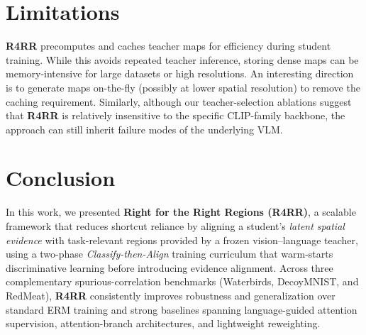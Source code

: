 \section{Limitations}
\textbf{R4RR} precomputes and caches teacher maps for efficiency during student training. While this avoids repeated teacher inference, storing dense maps can be memory-intensive for large datasets or high resolutions. An interesting direction is to generate maps on-the-fly (possibly at lower spatial resolution) to remove the caching requirement. Similarly, although our teacher-selection ablations suggest that \textbf{R4RR} is relatively insensitive to the specific CLIP-family backbone, the approach can still inherit failure modes of the underlying VLM. 


\section{Conclusion}
In this work, we presented \textbf{Right for the Right Regions (R4RR)}, a scalable framework that reduces shortcut reliance by aligning a student’s \emph{latent spatial evidence} with task-relevant regions provided by a frozen vision--language teacher, using a two-phase \emph{Classify-then-Align} training curriculum that warm-starts discriminative learning before introducing evidence alignment. Across three complementary spurious-correlation benchmarks (Waterbirds, DecoyMNIST, and RedMeat), \textbf{R4RR} consistently improves robustness and generalization over standard ERM training and strong baselines spanning language-guided attention supervision, attention-branch architectures, and lightweight reweighting. 


